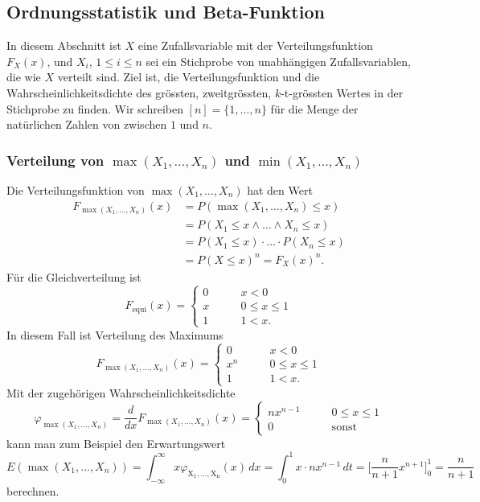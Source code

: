 %
%
%
\subsection{Ordnungsstatistik und Beta-Funktion
\label{buch:rekursion:ordnung:section:ordnungsstatistik}}
In diesem Abschnitt ist $X$ eine Zufallsvariable mit der Verteilungsfunktion
$F_X(x)$, und $X_i$, $1\le i\le n$ sei ein Stichprobe von unabhängigen
Zufallsvariablen, die wie $X$ verteilt sind.
Ziel ist, die Verteilungsfunktion und die Wahrscheinlichkeitsdichte
des grössten, zweitgrössten, $k$-t-grössten Wertes in der Stichprobe
zu finden.
Wir schreiben $[n]=\{1,\dots,n\}$ für die Menge der natürlichen
Zahlen von zwischen $1$ und $n$.

\subsubsection{Verteilung von $\operatorname{max}(X_1,\dots,X_n)$ und
$\operatorname{min}(X_1,\dots,X_n)$
\label{buch:rekursion:ordnung:subsection:minmax}}
Die Verteilungsfunktion von $\operatorname{max}(X_1,\dots,X_n)$ hat
den Wert
\begin{align*}
F_{\operatorname{max}(X_1,\dots,X_n)}(x)
&=
P(\operatorname{max}(X_1,\dots,X_n) \le x)
\\
&=
P(X_1\le x\wedge \dots \wedge X_n\le x)
\\
&=
P(X_1\le x) \cdot \ldots \cdot P(X_n\le x)
\\
&=
P(X\le x)^n
=
F_X(x)^n.
\end{align*}
Für die Gleichverteilung ist
\[
F_{\text{equi}}(x)
=
\begin{cases}
0&\qquad x< 0
\\
x&\qquad 0\le x\le 1
\\
1&\qquad 1<x.
\end{cases}
\]
In diesem Fall ist Verteilung des Maximums
\[
F_{\operatorname{max}(X_1,\dots,X_n)}(x)
=
\begin{cases}
0&\qquad x<0\\
x^n&\qquad 0\le x\le 1\\
1&\qquad 1 < x.
\end{cases}
\]
Mit der zugehörigen Wahrscheinlichkeitsdichte
\[
\varphi_{\operatorname{max}(X_1,\dots,X_n)}
=
\frac{d}{dx}
F_{\operatorname{max}(X_1,\dots,X_n)}(x)
=
\begin{cases}
nx^{n-1}&\qquad 0\le x\le 1\\
0       &\qquad \text{sonst}
\end{cases}
\]
kann man zum Beispiel den Erwartungswert
\[
E(\operatorname{max}(X_1,\dots,X_n))
=
\int_{-\infty}^\infty 
x
\varphi_{\operatorname{X_1,\dots,X_n}}(x)
\,dx
=
\int_{0}^1 x\cdot nx^{n-1}\,dt
=
\biggl[
\frac{n}{n+1}x^{n+1}
\biggr]_0^1
=
\frac{n}{n+1}
\]
berechnen.

